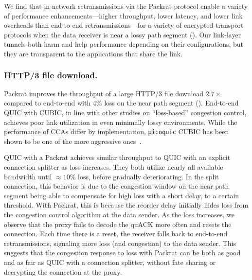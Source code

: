 

We find that in-network retransmissions via the Packrat protocol enable a
variety of performance enhancements---higher throughput, lower latency, and
lower link overheads than end-to-end retransmissions---for a variety of
encrypted transport protocols when the data receiver is near a lossy path
segment (). Our link-layer tunnels both harm and help
performance depending on their configurations, but they are transparent to the
applications that share the link.

\subsubsection{HTTP/3 file download.}
Packrat improves the throughput of a large HTTP/3 file download
$2.7\times$
compared to end-to-end with 4\% loss on the near path segment
(). End-to-end QUIC with CUBIC, in line with other
studies on ``loss-based'' congestion control, achieves poor link utilization in
even minimally lossy environments. While the performance of CCAs differ by
implementation, \texttt{picoquic} CUBIC has been shown to be one of the more
aggressive ones~\cite{yuan2025internet}.

QUIC with a Packrat achieves similar throughput to QUIC with an explicit
connection splitter as loss increases. They both utilize nearly all available
bandwidth until $\approx\!10\%$ loss, before gradually deteriorating. In the
split connection, this behavior is due to the congestion window on the near
path segment being able to compensate for high loss with a short delay, to a
certain threshold. With Packrat, this is because the reorder delay initially
hides loss from the congestion control algorithm at the data sender. As the
loss increases, we observe that the proxy fails to decode the quACK more often
and resets the connection. Each time there is a reset, the receiver falls back
to end-to-end retransmissions, signaling more loss (and congestion) to the data
sender. This suggests that the congestion response to loss with Packrat can be
both as good and as fair as QUIC with a connection splitter, without fate
sharing or decrypting the connection at the proxy.

